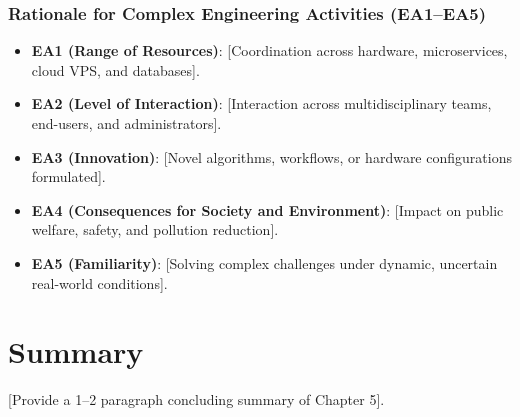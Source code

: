 \subsubsection{Rationale for Complex Engineering Activities (EA1--EA5)}
\begin{itemize}
    \item \textbf{EA1 (Range of Resources)}: [Coordination across hardware, microservices, cloud VPS, and databases].
    \item \textbf{EA2 (Level of Interaction)}: [Interaction across multidisciplinary teams, end-users, and administrators].
    \item \textbf{EA3 (Innovation)}: [Novel algorithms, workflows, or hardware configurations formulated].
    \item \textbf{EA4 (Consequences for Society and Environment)}: [Impact on public welfare, safety, and pollution reduction].
    \item \textbf{EA5 (Familiarity)}: [Solving complex challenges under dynamic, uncertain real-world conditions].
\end{itemize}

\section{Summary}
[Provide a 1--2 paragraph concluding summary of Chapter 5].
